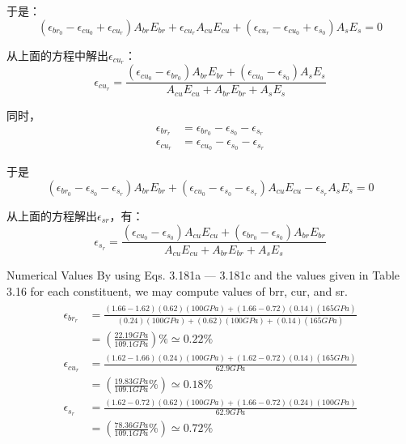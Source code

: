 于是：
\begin{equation*}
(\epsilon_{br_0}-\epsilon_{cu_0}+\epsilon_{cu_r})A_{br}E_{br}+\epsilon_{cu_r}A_{cu}E_{cu}+(\epsilon_{cu_r}-\epsilon_{cu_0}+\epsilon_{s_0})A_sE_s=0
\end{equation*}

从上面的方程中解出$\epsilon_{cu_r}$：
\begin{equation}%
\epsilon_{cu_r}=\frac{(\epsilon_{cu_0}-\epsilon_{br_0})A_{br}E_{br}+(\epsilon_{cu_0}-\epsilon_{s_0})A_sE_s}{A_{cu}E_{cu}+A_{br}E_{br}+A_{s}E_{s}}
\end{equation}

同时，
\begin{eqnarray*}
\epsilon_{br_r}&=\epsilon_{br_0}-\epsilon_{s_0}-\epsilon_{s_r}\\
\epsilon_{cu_r}&=\epsilon_{cu_0}-\epsilon_{s_0}-\epsilon_{s_r}
\end{eqnarray*}

于是
\begin{equation*}
(\epsilon_{br_0}-\epsilon_{s_0}-\epsilon_{s_r})A_{br}E_{br}+(\epsilon_{cu_0}-\epsilon_{s_0}-\epsilon_{s_r})A_{cu}E_{cu}-\epsilon_{s_r}A_sE_s=0
\end{equation*}

从上面的方程解出$\epsilon_{sr}$，有：
\begin{equation}%
\epsilon_{s_r}=\frac{(\epsilon_{cu_0}-\epsilon_{s_0})A_{cu}E_{cu}+(\epsilon_{br_0}-\epsilon_{s_0})A_{br}E_{br}}{A_{cu}E_{cu}+A_{br}E_{br}+A_{s}E_{s}}
\end{equation}

Numerical Values By using Eqs. 3.181a — 3.181c and the values given in Table
3.16 for each constituent, we may compute values of brr, cur, and sr.
\begin{eqnarray*}%
\begin{split}
\epsilon_{br_r}&=\frac{(1.66-1.62)(0.62)(100GPa)+(1.66-0.72)(0.14)(165GPa)}{(0.24)(100GPa)+(0.62)(100GPa)+(0.14)(165GPa)}\\
&=(\frac{22.19GPa}{109.1GPa})\% \simeq0.22\% \\
\epsilon_{cu_r}&=\frac{(1.62-1.66)(0.24)(100GPa)+(1.62-0.72)(0.14)(165GPa)}{62.9GPa}\\
&=(\frac{19.83GPa}{109.1GPa}\%)\simeq0.18\% \\
\epsilon_{s_r}&=\frac{(1.62-0.72)(0.62)(100GPa)+(1.66-0.72)(0.24)(100GPa)}{62.9GPa}\\
&=(\frac{78.36GPa}{109.1GPa}\%)\simeq0.72\% 
\end{split}
\end{eqnarray*}

